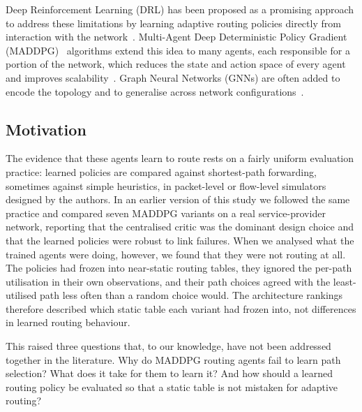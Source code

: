 \documentclass[10pt,journal,comsoc]{IEEEtran}
\begin{document}
Deep Reinforcement Learning (DRL) has been proposed as a promising approach to address these limitations by learning adaptive routing policies directly from interaction with the network~\cite{abrol2024deep,valadarsky2017learning}. Multi-Agent Deep Deterministic Policy Gradient (MADDPG)~\cite{lowe2017multi} algorithms extend this idea to many agents, each responsible for a portion of the network, which reduces the state and action space of every agent and improves scalability~\cite{bhavanasi2022routing,geng2020multi,li2022applications}. Graph Neural Networks (GNNs) are often added to encode the topology and to generalise across network configurations~\cite{bhavanasi2022routing,he2023routing,almasan2022deep}.

\subsection{Motivation}
The evidence that these agents learn to route rests on a fairly uniform evaluation practice: learned policies are compared against shortest-path forwarding, sometimes against simple heuristics, in packet-level or flow-level simulators designed by the authors. In an earlier version of this study we followed the same practice and compared seven MADDPG variants on a real service-provider network, reporting that the centralised critic was the dominant design choice and that the learned policies were robust to link failures. When we analysed what the trained agents were doing, however, we found that they were not routing at all. The policies had frozen into near-static routing tables, they ignored the per-path utilisation in their own observations, and their path choices agreed with the least-utilised path less often than a random choice would. The architecture rankings therefore described which static table each variant had frozen into, not differences in learned routing behaviour.

This raised three questions that, to our knowledge, have not been addressed together in the literature. Why do MADDPG routing agents fail to learn path selection? What does it take for them to learn it? And how should a learned routing policy be evaluated so that a static table is not mistaken for adaptive routing?
\end{document}
